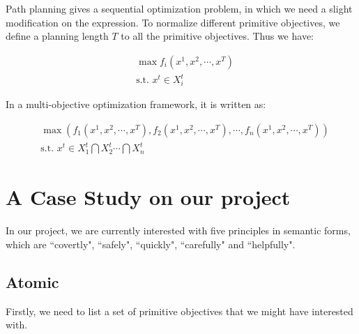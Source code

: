 \documentclass[12pt]{article}
\begin{document}
Path planning gives a sequential optimization problem, in which we need a slight modification on the expression. To normalize different primitive objectives, we define a planning length $ T $ to all the primitive objectives. Thus we have:

\begin{equation}
\label{eq:pathPlanningObj}
\begin{aligned}
& \max f_{i}(x^{1}, x^{2}, \cdots , x^{T}) \\
& \mbox{s.t. } x^{t} \in X_{i}^{t}
\end{aligned}
\end{equation}

In a multi-objective optimization framework, it is written as:

\begin{equation}
\label{eq:pathPlanningMutObj}
\begin{aligned}
& \max \left( f_{1}(x^{1}, x^{2}, \cdots , x^{T}) , f_{2}(x^{1}, x^{2}, \cdots , x^{T}), \cdots , f_{n}(x^{1}, x^{2}, \cdots , x^{T})  \right) \\
& \mbox{s.t. } x^{t} \in X_{1}^{t} \bigcap X_{2}^{t} \cdots \bigcap X_{n}^{t}
\end{aligned}
\end{equation}


\section{A Case Study on our project}

In our project, we are currently interested with five principles in semantic forms, which are ``covertly", ``safely", ``quickly", ``carefully" and ``helpfully". 

\subsection{Atomic}

Firstly, we need to list a set of primitive objectives that we might have interested with.
\end{document}
